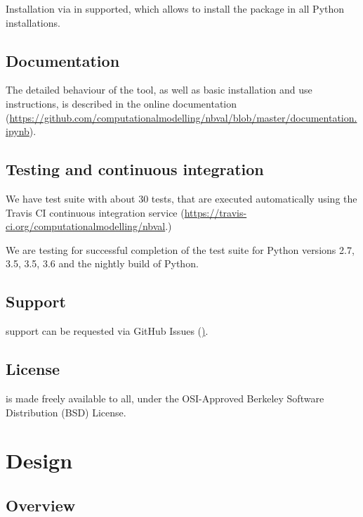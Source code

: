 \documentclass{deliverablereport}
\begin{document}
Installation via  in supported, which allows to install the
package in all Python installations.

\subsection{Documentation}

The detailed behaviour of the tool,
as well as basic installation and use instructions,
is described in the online documentation
\newline(\href{https://github.com/computationalmodelling/nbval/blob/master/documentation.ipynb}{https://github.com/computationalmodelling/nbval/blob/master/documentation.ipynb}).

\subsection{Testing and continuous integration}

We have test suite with about 30 tests, that are executed
automatically using the Travis CI continuous integration service
(\href{https://travis-ci.org/computationalmodelling/nbval}{https://travis-ci.org/computationalmodelling/nbval}.)

We are testing for successful completion of the test suite for
Python versions 2.7, 3.5, 3.5, 3.6 and the nightly build of Python.

\subsection{Support}

\nbval support can be requested via GitHub Issues (\href{https://github.com/computationalmodelling/nbval/issues}).

\subsection{License}

\nbval is made freely available to all,
under the OSI-Approved Berkeley Software Distribution (BSD) License.

\section{Design}
\subsection{Overview}
\end{document}
